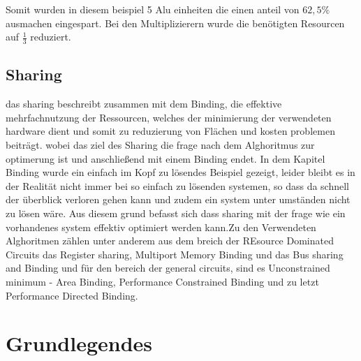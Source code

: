 \documentclass[conference]{IEEEtran}
\begin{document}
Somit wurden in diesem beispiel 5 Alu einheiten die einen anteil von $62,5\%$ ausmachen eingespart. Bei den Multiplizierern wurde die benötigten Resourcen auf $\frac{1}{3}$ reduziert.


\subsection{Sharing}
das sharing beschreibt zusammen mit dem Binding,  die effektive mehrfachnutzung der Ressourcen, welches der minimierung der verwendeten hardware dient und somit zu reduzierung von Flächen und kosten problemen beiträgt. wobei das ziel des Sharing die frage nach dem Alghoritmus zur optimerung ist und anschließend mit einem Binding endet. In dem Kapitel Binding wurde ein einfach im Kopf zu lösendes Beispiel gezeigt, leider bleibt es in der Realität nicht immer bei so einfach zu lösenden systemen, so dass da schnell der überblick verloren gehen kann und zudem ein system unter umständen nicht zu lösen wäre. Aus diesem grund befasst sich dass sharing mit der frage wie ein vorhandenes system effektiv optimiert werden kann.Zu den Verwendeten Alghoritmen zählen unter anderem aus dem breich der REsource Dominated Circuits das Register sharing, Multiport Memory Binding und das Bus sharing and Binding und für den bereich der general circuits, sind es Unconstrained minimum - Area Binding, Performance Constrained Binding und zu letzt Performance Directed Binding.   
\section{Grundlegendes}
\end{document}
